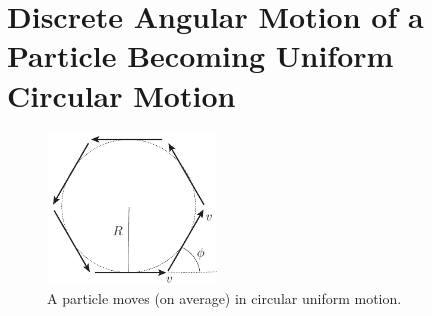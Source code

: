 \documentclass[12pt]{article}
\begin{document}
\section{Discrete Angular Motion of a Particle Becoming Uniform Circular Motion}

\begin{figure}
\centering
\includegraphics[width=0.4\textwidth]{circle.png}
\caption{\label{fig:fig1} A particle moves (on average) in circular uniform motion.}
\end{figure}
\end{document}
